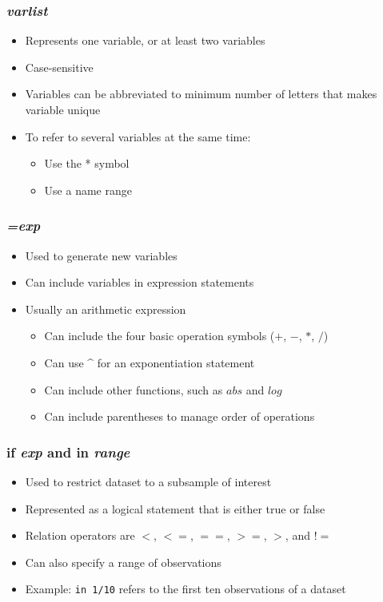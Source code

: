 \documentclass{beamer}
\begin{document}
\begin{frame}
	\frametitle{\textit{varlist}}
		\begin{itemize}
			\item Represents one variable, or at least two variables
			\item Case-sensitive
			\item Variables can be abbreviated to minimum number of letters that makes variable unique
			\item To refer to several variables at the same time:
				\begin{itemize}
					\item Use the * symbol
					\item Use a name range
				\end{itemize}
		\end{itemize}
\end{frame}

\begin{frame}
	\frametitle{\textit{=exp}}
		\begin{itemize}
			\item Used to generate new variables
			\item Can include variables in expression statements
			\item Usually an arithmetic expression
				\begin{itemize}
					\item Can include the four basic operation symbols ($+$, $-$, $*$, $/$)
					\item Can use \^{} for an exponentiation statement
					\item Can include other functions, such as $abs$ and $log$
					\item Can include parentheses to manage order of operations
				\end{itemize}
		\end{itemize}
\end{frame}

\begin{frame}
	\frametitle{if \textit{exp} and in \textit{range}}
		\begin{itemize}
			\item Used to restrict dataset to a subsample of interest
			\item Represented as a logical statement that is either true or false
			\item Relation operators are $<$, $<=$, $==$, $>=$, $>$, and $!=$
			\item Can also specify a range of observations
			\item Example: \texttt{in 1/10} refers to the first ten observations of a dataset
		\end{itemize}
\end{frame}
\end{document}

